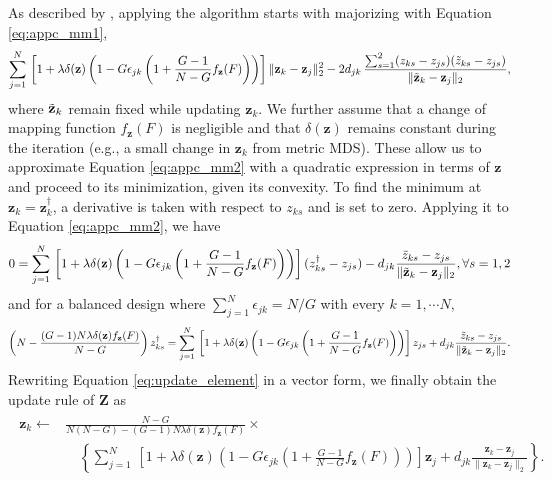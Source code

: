 \documentclass[11pt]{article}
\newcommand{\1}{{\rm 1}\kern-0.24em{\rm I}}
\begin{document}
As described by \cite{borg97b}, applying the algorithm starts with majorizing with Equation \ref{eq:appc_mm1},
\begin{equation}
\sum_{j=1}^N\,
\left[1+\lambda\delta(\mathbf{z}) \left(1- G \epsilon_{jk} \left(1+ \frac{G-1}{N-G}{f_\mathbf{z}(F)} \right)\right) \right] \|\mathbf{z}_k-\mathbf{z}_j\|_2^2 - 2d_{jk}\,\frac{\sum_{s=1}^2 (z_{ks}-z_{js})(\Tilde{z}_{ks}-z_{js})}{\|\Tilde{\mathbf{z}}_k-\mathbf{z}_j\|_2}, \label{eq:appc_mm2}
\end{equation}
where $\Tilde{\mathbf{z}}_k$ remain fixed while updating ${\mathbf{z}}_k$. We further assume that a change of mapping function $f_\mathbf{z}(F)$ is negligible and that $\delta(\mathbf{z})$ remains constant during the iteration (e.g., a small change in $\mathbf{z}_k$ from metric MDS). These allow us to approximate Equation \ref{eq:appc_mm2} with a quadratic expression in terms of $\mathbf{z}$ and proceed to its minimization, given its convexity.
To find the minimum at $\mathbf{z}_{k}=\mathbf{z}_{k}^\dagger$, a derivative is taken with respect to $z_{ks}$ and is set to zero.
Applying it to Equation \ref{eq:appc_mm2}, we have
\begin{align}
\begin{split}
0 = \sum_{j=1}^N\, \left[1+\lambda\delta(\mathbf{z}) \left(1- G\epsilon_{jk} \left(1 + \frac{G-1}{N-G}{f_\mathbf{z}(F)} \right)\right) \right] (z_{ks}^\dagger - z_{js}) 
- d_{jk}\frac{\Tilde{z}_{ks}-z_{js}}{\|\Tilde{\mathbf{z}}_k-\mathbf{z}_j\|_2}, \forall s=1,2
\label{eq:mm_balance}
\end{split}
\end{align}
and for a balanced design where $\sum_{j=1}^N \epsilon_{jk}= {N}/{G}$ with every $k=1,\cdots N$,
\begin{align}
\left( N - \frac{(G-1)N\lambda\delta(\mathbf{z})f_\mathbf{z}(F)}{N-G} \right) z_{ks}^\dagger = \sum_{j=1}^N\, \left[1+\lambda\delta(\mathbf{z}) \left(1- G \epsilon_{jk} \left(1+ \frac{G-1}{N-G}{f_\mathbf{z}(F)} \right)\right) \right] z_{js} + d_{jk}\frac{\Tilde{z}_{ks}-z_{js}}{\|\Tilde{\mathbf{z}}_k-\mathbf{z}_j\|_2}.
\label{eq:update_element}
\end{align}
Rewriting Equation \ref{eq:update_element} in a vector form, we finally obtain the update rule of $\mathbf{Z}$ as
\begin{align}
\begin{split}
\mathbf{z}_k \gets
& \frac{N-G}{N(N-G) - (G-1)N\lambda\delta(\mathbf{z}) f_\mathbf{z}(F)}\times \\ 
&\quad\left\{\sum_{j=1}^N\, \left[1+\lambda\delta(\mathbf{z}) \left(1- G \epsilon_{jk} \left(1+ \frac{G-1}{N-G}{f_\mathbf{z}(F)} \right)\right) \right]  \mathbf{z}_{j} + d_{jk}\frac{\mathbf{z}_k -\mathbf{z}_j}{\|{\mathbf{z}}_k-\mathbf{z}_j\|_2}\right\}.
\label{eq:mm_update}
\end{split}
\end{align}
\end{document}
